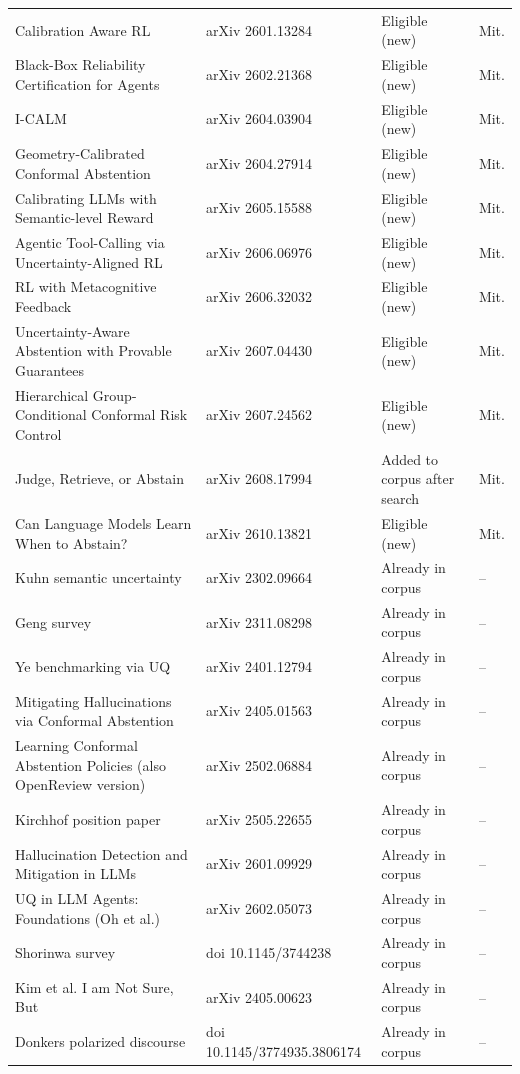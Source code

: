 \documentclass[acmsmall]{acmart}
\begin{document}
\begin{center}
\begin{longtable}{@{}p{5.6cm} p{3.6cm} p{2.4cm} p{0.9cm}@{}}
Calibration Aware RL & arXiv 2601.13284 & Eligible (new) & Mit. \\
Black-Box Reliability Certification for Agents & arXiv 2602.21368 & Eligible (new) & Mit. \\
I-CALM & arXiv 2604.03904 & Eligible (new) & Mit. \\
Geometry-Calibrated Conformal Abstention & arXiv 2604.27914 & Eligible (new) & Mit. \\
Calibrating LLMs with Semantic-level Reward & arXiv 2605.15588 & Eligible (new) & Mit. \\
Agentic Tool-Calling via Uncertainty-Aligned RL & arXiv 2606.06976 & Eligible (new) & Mit. \\
RL with Metacognitive Feedback & arXiv 2606.32032 & Eligible (new) & Mit. \\
Uncertainty-Aware Abstention with Provable Guarantees & arXiv 2607.04430 & Eligible (new) & Mit. \\
Hierarchical Group-Conditional Conformal Risk Control & arXiv 2607.24562 & Eligible (new) & Mit. \\
Judge, Retrieve, or Abstain & arXiv 2608.17994 & Added to corpus after search & Mit. \\
Can Language Models Learn When to Abstain? & arXiv 2610.13821 & Eligible (new) & Mit. \\
Kuhn semantic uncertainty & arXiv 2302.09664 & Already in corpus & -- \\
Geng survey & arXiv 2311.08298 & Already in corpus & -- \\
Ye benchmarking via UQ & arXiv 2401.12794 & Already in corpus & -- \\
Mitigating Hallucinations via Conformal Abstention & arXiv 2405.01563 & Already in corpus & -- \\
Learning Conformal Abstention Policies (also OpenReview version) & arXiv 2502.06884 & Already in corpus & -- \\
Kirchhof position paper & arXiv 2505.22655 & Already in corpus & -- \\
Hallucination Detection and Mitigation in LLMs & arXiv 2601.09929 & Already in corpus & -- \\
UQ in LLM Agents: Foundations (Oh et al.) & arXiv 2602.05073 & Already in corpus & -- \\
Shorinwa survey & doi 10.1145/3744238 & Already in corpus & -- \\
Kim et al. I am Not Sure, But & arXiv 2405.00623 & Already in corpus & -- \\
Donkers polarized discourse & doi 10.1145/3774935.3806174 & Already in corpus & -- \\

\end{longtable}
\end{center}
\end{document}
